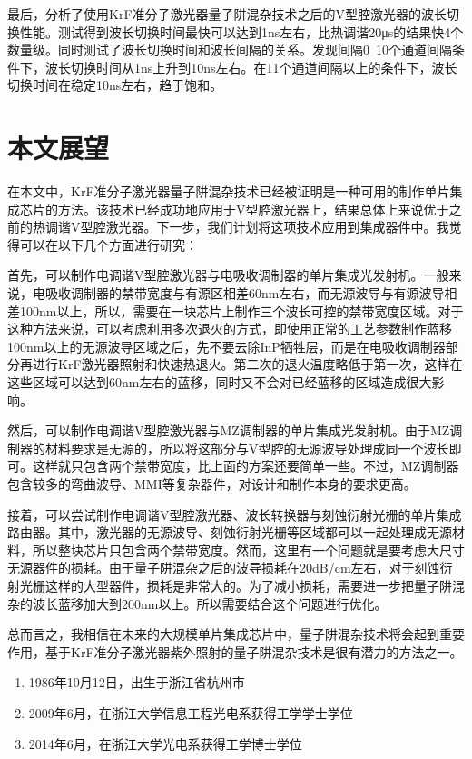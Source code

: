 \documentclass{ZJUthesis}
\begin{document}
最后，分析了使用KrF准分子激光器量子阱混杂技术之后的V型腔激光器的波长切换性能。测试得到波长切换时间最快可以达到1ns左右，比热调谐20μs的结果快4个数量级。同时测试了波长切换时间和波长间隔的关系。发现间隔0~10个通道间隔条件下，波长切换时间从1ns上升到10ns左右。在11个通道间隔以上的条件下，波长切换时间在稳定10ns左右，趋于饱和。

\section{本文展望}

在本文中，KrF准分子激光器量子阱混杂技术已经被证明是一种可用的制作单片集成芯片的方法。该技术已经成功地应用于V型腔激光器上，结果总体上来说优于之前的热调谐V型腔激光器。下一步，我们计划将这项技术应用到集成器件中。我觉得可以在以下几个方面进行研究：

首先，可以制作电调谐V型腔激光器与电吸收调制器的单片集成光发射机。一般来说，电吸收调制器的禁带宽度与有源区相差60nm左右，而无源波导与有源波导相差100nm以上，所以，需要在一块芯片上制作三个波长可控的禁带宽度区域。对于这种方法来说，可以考虑利用多次退火的方式，即使用正常的工艺参数制作蓝移100nm以上的无源波导区域之后，先不要去除InP牺牲层，而是在电吸收调制器部分再进行KrF激光器照射和快速热退火。第二次的退火温度略低于第一次，这样在这些区域可以达到60nm左右的蓝移，同时又不会对已经蓝移的区域造成很大影响。

然后，可以制作电调谐V型腔激光器与MZ调制器的单片集成光发射机。由于MZ调制器的材料要求是无源的，所以将这部分与V型腔的无源波导处理成同一个波长即可。这样就只包含两个禁带宽度，比上面的方案还要简单一些。不过，MZ调制器包含较多的弯曲波导、MMI等复杂器件，对设计和制作本身的要求更高。

接着，可以尝试制作电调谐V型腔激光器、波长转换器与刻蚀衍射光栅的单片集成路由器。其中，激光器的无源波导、刻蚀衍射光栅等区域都可以一起处理成无源材料，所以整块芯片只包含两个禁带宽度。然而，这里有一个问题就是要考虑大尺寸无源器件的损耗。由于量子阱混杂之后的波导损耗在20dB/cm左右，对于刻蚀衍射光栅这样的大型器件，损耗是非常大的。为了减小损耗，需要进一步把量子阱混杂的波长蓝移加大到200nm以上。所以需要结合这个问题进行优化。

总而言之，我相信在未来的大规模单片集成芯片中，量子阱混杂技术将会起到重要作用，基于KrF准分子激光器紫外照射的量子阱混杂技术是很有潜力的方法之一。

\ZJUbackmatter



\begin{resume}
\begin{enumerate}
\item{1986年10月12日，出生于浙江省杭州市}
\item{2009年6月，在浙江大学信息工程光电系获得工学学士学位}
\item{2014年6月，在浙江大学光电系获得工学博士学位}
\end{enumerate}
\end{resume}
\end{document}
